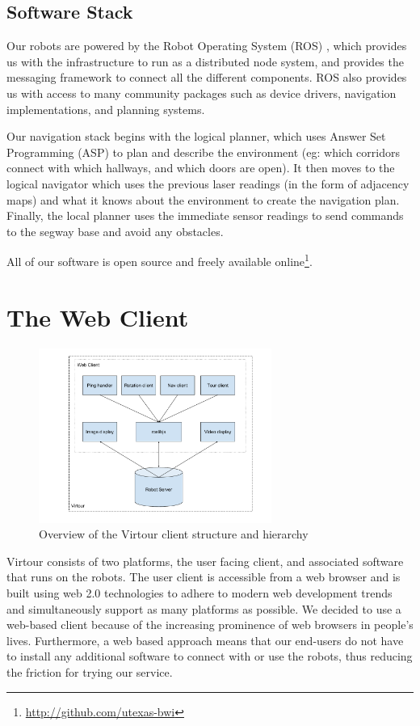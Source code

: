 \documentclass[
  oneside,
  11pt, a4paper,
  footinclude=true,
  headinclude=true,
  cleardoublepage=empty
]{article}
\begin{document}
\subsection{Software Stack}

Our robots are powered by the Robot Operating System (ROS) \cite{quigley2009},
which provides us with the infrastructure to run as a distributed node system,
and provides the messaging framework to connect all the different components.
ROS also provides us with access to many community packages such as device
drivers, navigation implementations, and planning systems.

Our navigation stack begins with the logical planner, which uses Answer Set
Programming (ASP) \cite{lifschitz2008} to plan and describe the environment
(eg: which corridors connect with which hallways, and which doors are open). It
then moves to the logical navigator which uses the previous laser readings (in
the form of adjacency maps) and what it knows about the environment to create
the navigation plan. Finally, the local planner uses the immediate sensor
readings to send commands to the segway base and avoid any obstacles.

All of our software is open source and freely available
online\footnote{\url{http://github.com/utexas-bwi}}.

\section{The Web Client}

\begin{figure}
\centering
\includegraphics[width=3in]{virtour_client}
\caption{Overview of the Virtour client structure and hierarchy}
\end{figure}

Virtour consists of two platforms, the user facing client, and associated
software that runs on the robots. The user client is accessible from a web
browser and is built using web 2.0 technologies to adhere to modern web
development trends and simultaneously support as many platforms as possible. We
decided to use a web-based client because of the increasing prominence of web
browsers in people's lives. Furthermore, a web based approach means that our
end-users do not have to install any additional software to connect with or use
the robots, thus reducing the friction for trying our service.
\end{document}
